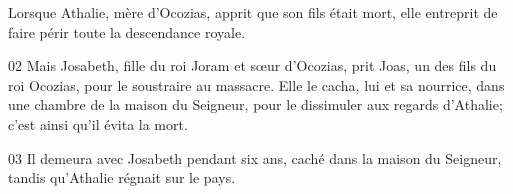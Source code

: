 Lorsque Athalie, mère d’Ocozias, apprit que son fils était mort, elle entreprit de faire périr toute la descendance royale.

02 Mais Josabeth, fille du roi Joram et sœur d’Ocozias, prit Joas, un des fils du roi Ocozias, pour le soustraire au massacre. Elle le cacha, lui et sa nourrice, dans une chambre de la maison du Seigneur, pour le dissimuler aux regards d’Athalie; c’est ainsi qu’il évita la mort.

03 Il demeura avec Josabeth pendant six ans, caché dans la maison du Seigneur, tandis qu’Athalie régnait sur le pays.
